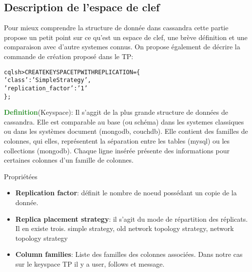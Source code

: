 \subsection{Description de l'espace de clef}
\par Pour mieux comprendre la structure de donnée dans cassandra
cette partie propose un petit point sur ce qu'est un espace de clef,
une brève définition et une comparaison avec d'autre systemes connus.
On propose également de décrire la commande de création proposé dans le TP: \newline

\begin{tt}
\begin{alltt}
cqlsh> CREATE KEYSPACE TP WITH REPLICATION = \{
\indent		'class' : 'SimpleStrategy',
\indent		'replication\_factor' : '1'
\};
\end{alltt}
\end{tt}

\textcolor{ForestGreen}{\textbf{Definition}}(Keyspace): Il s'aggit de la plus grande structure de données de cassandra. Elle est comparable au base (ou schéma)
dans les systemes classiques ou dans les systèmes document (mongodb, couchdb). Elle contient des familles de colonnes,  qui elles, représentent
la séparation entre les tables (mysql) ou les collections (mongodb). Chaque ligne insérée présente des informations pour certaines colonnes
d'un famille de colonnes.

\begin{block}{Propriétées}
\begin{itemize}
\item \textbf{Replication factor}: définit le nombre de noeud possédant un copie de la donnée. 
\item \textbf{Replica placement strategy}: il s'agit du mode de répartition des réplicats. Il en 
existe trois. simple strategy,  old network topology strategy, network topology strategy
\item \textbf{Column families}: Liste des familles des colonnes associées. Dans notre cas sur le keyspace
TP il y a user, follows et message.
\end{itemize}
\end{block}

